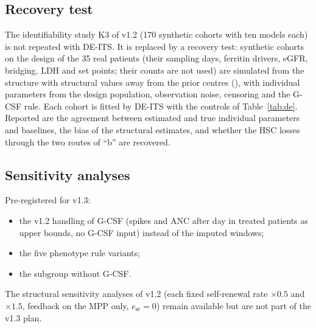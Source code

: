 \documentclass[11pt]{article}
\begin{document}






\subsection{Recovery test}\label{sec:recovery}
The identifiability study K3 of v1.2 (170 synthetic cohorts with ten models each) is not repeated with DE-ITS. It is replaced by a recovery test: \valRcohorts{} synthetic cohorts on the design of the 35 real patients (their sampling days, ferritin drivers, eGFR, bridging, LDH and set points; their counts are not used) are simulated from the structure \texttt{\valRmodel} with structural values away from the prior centres (\valRtruth), with individual parameters from the design population, observation noise, censoring and the G-CSF rule. Each cohort is fitted by DE-ITS with the controls of Table~\ref{tab:de}. Reported are the agreement between estimated and true individual parameters and baselines, the bias of the structural estimates, and whether the HSC losses through the two routes of ``b'' are recovered.

\subsection{Sensitivity analyses}
Pre-registered for v1.3:
\begin{itemize}
\item the v1.2 handling of G-CSF (spikes and ANC after day \valGcsfDay{} in treated patients as upper bounds, no G-CSF input) instead of the imputed windows;
\item the five phenotype rule variants;
\item the subgroup without G-CSF.
\end{itemize}
The structural sensitivity analyses of v1.2 (each fixed self-renewal rate $\times0.5$ and $\times1.5$, feedback on the MPP only, $e_{\mathrm{sr}}=0$) remain available but are not part of the v1.3 plan.

\end{document}

